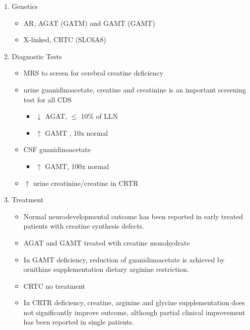\documentclass{scrartcl}
\begin{document}
\begin{enumerate}
\item Genetics
\label{sec:org3ae8fca}
\begin{itemize}
\item AR, AGAT (GATM) and GAMT (GAMT)
\item X-linked, CRTC (SLC6A8)
\end{itemize}
\item Diagnostic Tests
\label{sec:orgd3d2754}
\begin{itemize}
\item MRS to screen for cerebral creatine deficiency
\item urine guanidinoacetate, creatine and creatinine is an important
screening test for all CDS
\begin{itemize}
\item \(\downarrow\) AGAT, \(\le\) 10\% of LLN
\item \(\uparrow\) GAMT , 10x normal
\end{itemize}
\item CSF guanidinoacetate
\begin{itemize}
\item \(\uparrow\) GAMT, 100x normal
\end{itemize}
\item \(\uparrow\) urine creatinine/creatine in CRTR
\end{itemize}

\item Treatment
\label{sec:org0d8c6fb}
\begin{itemize}
\item Normal neurodevelopmental outcome has been reported in early treated
patients with creatine synthesis defects.
\item AGAT and GAMT treated wtih creatine monohydrate
\item In GAMT deficiency, reduction of guanidinoacetate is achieved by
ornithine supplementation \textpm{} dietary arginine restriction.
\item CRTC no treatment
\item In CRTR deficiency, creatine, arginine and glycine supplementation
does not significantly improve outcome, although partial clinical
improvement has been reported in single patients.
\end{itemize}
\end{enumerate}
\end{document}
